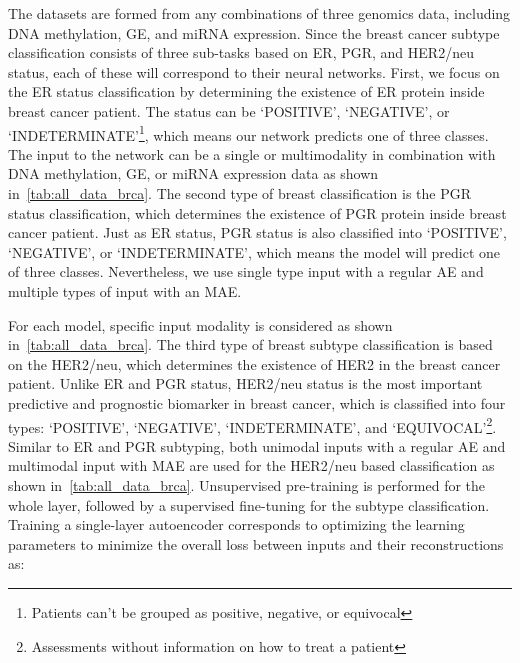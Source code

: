 \hspace*{3.5mm} The datasets are formed from any combinations of three genomics data, including DNA methylation, GE, and miRNA expression. Since the breast cancer subtype classification consists of three sub-tasks based on ER, PGR, and HER2/neu status, each of these will correspond to their neural networks. First, we focus on the ER status classification by determining the existence of ER protein inside breast cancer patient. The status can be `POSITIVE', `NEGATIVE', or `INDETERMINATE'\footnote{Patients can't be grouped as positive, negative, or equivocal}, which means our network predicts one of three classes. The input to the network can be a single or multimodality in combination with DNA methylation, GE, or miRNA expression data as shown in~\cref{tab:all_data_brca}. The second type of breast classification is the PGR status classification, which determines the existence of PGR protein inside breast cancer patient. Just as ER status, PGR status is also classified into `POSITIVE', `NEGATIVE', or `INDETERMINATE', which means the model will predict one of three classes. Nevertheless, we use single type input with a regular AE and multiple types of input with an MAE. 

\hspace*{3.5mm} For each model, specific input modality is considered as shown in~\cref{tab:all_data_brca}. The third type of breast subtype classification is based on the HER2/neu, which determines the existence of HER2 in the breast cancer patient. Unlike ER and PGR status, HER2/neu status is the most important predictive and prognostic biomarker in breast cancer, which is classified into four types: `POSITIVE', `NEGATIVE', `INDETERMINATE', and `EQUIVOCAL'\footnote{Assessments without information on how to treat a patient}. Similar to ER and PGR subtyping, both unimodal inputs with a regular AE and multimodal input with MAE are used for the HER2/neu based classification as shown in~\cref{tab:all_data_brca}. 
Unsupervised pre-training is performed for the whole layer, followed by a supervised fine-tuning for the subtype classification. 
Training a single-layer autoencoder corresponds to optimizing the learning parameters to minimize the overall loss between inputs and their reconstructions as:

